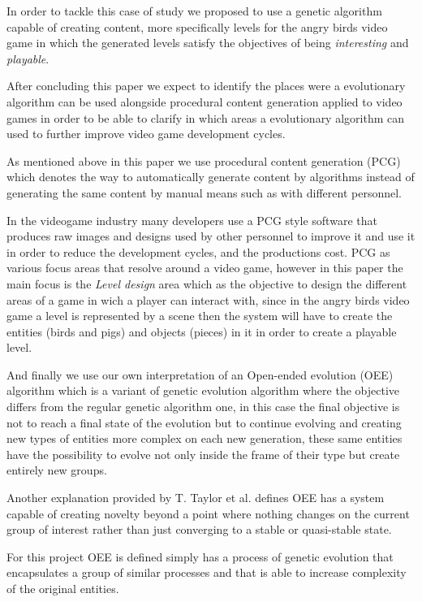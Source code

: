 \documentclass[conference]{IEEEtran}
\begin{document}
In order to tackle this case of study we proposed to use a genetic algorithm capable 
of creating content, more specifically levels for the angry birds video game in which
the generated levels satisfy the objectives of being \textit{interesting} and 
\textit{playable}.

After concluding this paper we expect to identify the places were a evolutionary 
algorithm can be used alongside procedural content generation applied to video games
in order to be able to clarify in which areas a evolutionary algorithm can used 
to further improve video game development cycles.

As mentioned above in this paper we use procedural content generation (PCG) 
which denotes the way to automatically generate
content by algorithms instead of generating the same content by manual means
such as with different personnel.

In the videogame industry many developers use a PCG style software that produces
raw images and designs used by other personnel to improve it and use it in order
to reduce the development cycles, and the productions cost. 
PCG as various focus areas that resolve around a video game, however in this paper 
the main focus is the \textit{Level design} area which as the objective to design 
the different areas of a game in wich a player can interact with, since in the 
angry birds video game a level is represented by a scene then the system will 
have to create the entities (birds and pigs) and objects (pieces) in it in order 
to create a playable level.

And finally we use our own interpretation of an Open-ended evolution (OEE) 
algorithm which is a variant of genetic evolution algorithm where
the objective differs from the regular genetic algorithm one, in this case the
final objective is not to reach a final state of the evolution but to continue
evolving and creating new types of entities more complex on each new generation,
these same entities have the possibility to evolve not only inside the frame of
their type but create entirely new groups. \cite{Standish2003}

Another explanation provided by T. Taylor et al. \cite{Taylor2016,Taylor}
defines OEE has a system capable of creating novelty beyond a point where
nothing changes on the current group of interest rather than just converging to
a stable or quasi-stable state.

For this project OEE is defined simply has a process of genetic evolution that
encapsulates a group of similar processes and that is able to increase complexity
 of the original entities.
\end{document}
